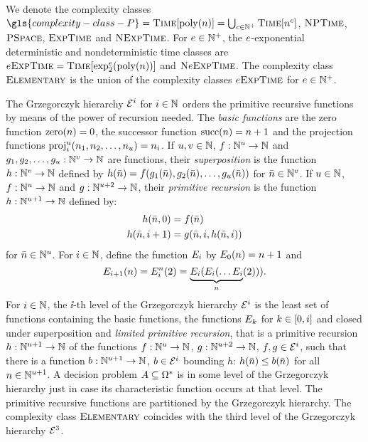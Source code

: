 We denote the complexity classes $\gls{complexity-class-P} =
\cTime{\poly\nn} = \bigcup_{c \in \pNats} \cTime{\nn^c}$,
$\text{\normalfont{\scshape NPTime}}$, $\text{\normalfont{\scshape PSpace}}$, $\text{\normalfont{\scshape ExpTime}}$ and $\text{\normalfont{\scshape NExpTime}}$.
For $e \in \mathbb{N}^{+}$, the
$e$-exponential deterministic and nondeterministic time classes are
${e\text{\normalfont{\scshape ExpTime}}} = \text{\normalfont{\scshape Time}}[\exp_{2}^{e}(\operatorname{poly}(n))]$ and $\text{\normalfont{\scshape N}}e\text{\normalfont{\scshape ExpTime}}$.
The complexity class $\text{\normalfont{\scshape Elementary}}$ is the union of the complexity classes
${e\text{\normalfont{\scshape ExpTime}}}$ for $e \in \mathbb{N}^{+}$.

The Grzegorczyk hierarchy $\mathcal{E}^{i}$ for $i\in\mathbb{N}$ orders the primitive
recursive functions by means of the power of recursion needed.
The \emph{basic functions} are
the zero function $\mathrm{zero}(n) = 0$,
the successor function $\mathrm{succ}(n) = n+1$ and
the projection functions $\mathrm{proj}_i^u(n_1,n_2,\dots,n_u) = n_i$.
If $u,v \in \mathbb{N}$, $f : \mathbb{N}^u \to \mathbb{N}$ and
$g_1,g_2,\dots,g_u : \mathbb{N}^v \to \mathbb{N}$ are functions,
their \emph{superposition} is the function $h : \mathbb{N}^v \to \mathbb{N}$
defined by $h(\bar{n}) =
  f(
  g_1(\bar{n}),
  g_2(\bar{n}), \dots,
  g_u(\bar{n}))$ for $\bar{n} \in \mathbb{N}^v$.
If $u \in \mathbb{N}$, $f : \mathbb{N}^u \to \mathbb{N}$ and
$g : \mathbb{N}^{u+2} \to \mathbb{N}$, their \emph{primitive recursion} is the
function $h : \mathbb{N}^{u+1} \to \mathbb{N}$ defined by:
\begin{align*}
h(\bar{n},0) &= f(\bar{n}) \\
h(\bar{n},i+1) &= g(\bar{n},i,h(\bar{n},i))
\end{align*}
for $\bar{n} \in \mathbb{N}^u$.
For $i \in \mathbb{N}$, define the function $E_{i}$ by $E_{0}(n) =
n+1$ and 
\[
  E_{i+1}(n) = E_{i}^n(2) =
  \underbrace{E_{i}(E_{i}(\dots E_{i}}_n(2))).
\]
For $i \in \mathbb{N}$, the $\ii$-th level of the Grzegorczyk hierarchy $\mathcal{E}^{i}$
is the least set of functions containing the basic functions, the functions
$E_{k}$ for $k \in [0,i]$ and closed under superposition and
\emph{limited primitive recursion}, that is a primitive recursion $h :
\mathbb{N}^{u+1}\to\mathbb{N}$ of the functions $f : \mathbb{N}^u \to \mathbb{N}$, 
$g : \mathbb{N}^{u+2} \to \mathbb{N}$, $f,g \in \mathcal{E}^{i}$, such that there is a function
$b : \mathbb{N}^{u+1} \to \mathbb{N}$,
$b \in \mathcal{E}^{i}$ bounding $h$: $h(\bar{n}) \leq b(\bar{n})$ for all $n \in
\mathbb{N}^{u+1}$. A decision problem $A \subseteq \Omega^{*}$ is in some
level of the Grzegorczyk hierarchy just in case its characteristic function
occurs at that level.
The primitive recursive functions are partitioned by the Grzegorczyk hierarchy.
The complexity class $\text{\normalfont{\scshape Elementary}}$ coincides with the third level of the
Grzegorczyk hierarchy $\mathcal{E}^{3}$.